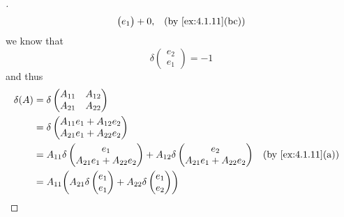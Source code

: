 \begin{proof}[]
\begin{align*}
\begin{pmatrix}
			                    e_1
		                    \end{pmatrix} + 0,       &  & \by{ex:4.1.11}[bc]
	\end{align*}
	we know that
	\[
		\delta\begin{pmatrix}
			e_2 \\
			e_1
		\end{pmatrix} = -1
	\]
	and thus
	\begin{align*}
		\delta(A) & = \delta\begin{pmatrix}
			                    A_{1 1} & A_{1 2} \\
			                    A_{2 1} & A_{2 2}
		                    \end{pmatrix}                                                                                     \\
		          & = \delta\begin{pmatrix}
			                    A_{1 1} e_1 + A_{1 2} e_2 \\
			                    A_{2 1} e_1 + A_{2 2} e_2
		                    \end{pmatrix}                                                                             \\
		          & = A_{1 1} \delta\begin{pmatrix}
			                            e_1 \\
			                            A_{2 1} e_1 + A_{2 2} e_2
		                            \end{pmatrix} + A_{1 2} \delta\begin{pmatrix}
			                                                          e_2 \\
			                                                          A_{2 1} e_1 + A_{2 2} e_2
		                                                          \end{pmatrix}             &  & \by{ex:4.1.11}[a]                \\
		          & = A_{1 1} \pa{A_{2 1} \delta\begin{pmatrix}
				                                        e_1 \\
				                                        e_1
			                                        \end{pmatrix} + A_{2 2} \delta\begin{pmatrix}
				                                                                      e_1 \\
				                                                                      e_2

\end{pmatrix}}
\end{align*}
\end{proof}

